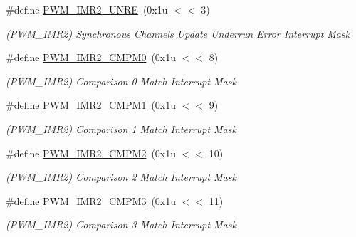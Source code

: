 \begin{DoxyCompactItemize}
\mbox{\label{group__SAME70__PWM_ga85e7cc43a764e203d90db792459a49c7}} 
\#define \mbox{\hyperlink{group__SAME70__PWM_ga85e7cc43a764e203d90db792459a49c7}{P\+W\+M\+\_\+\+I\+M\+R2\+\_\+\+U\+N\+RE}}~(0x1u $<$$<$ 3)
\begin{DoxyCompactList}\small\item\em (P\+W\+M\+\_\+\+I\+M\+R2) Synchronous Channels Update Underrun Error Interrupt Mask \end{DoxyCompactList}\item 
\mbox{\label{group__SAME70__PWM_ga37414bfbc6978c6fe9b00fa217792ca5}} 
\#define \mbox{\hyperlink{group__SAME70__PWM_ga37414bfbc6978c6fe9b00fa217792ca5}{P\+W\+M\+\_\+\+I\+M\+R2\+\_\+\+C\+M\+P\+M0}}~(0x1u $<$$<$ 8)
\begin{DoxyCompactList}\small\item\em (P\+W\+M\+\_\+\+I\+M\+R2) Comparison 0 Match Interrupt Mask \end{DoxyCompactList}\item 
\mbox{\label{group__SAME70__PWM_ga3ea81ef42b970526d8bbd56cb4b5d423}} 
\#define \mbox{\hyperlink{group__SAME70__PWM_ga3ea81ef42b970526d8bbd56cb4b5d423}{P\+W\+M\+\_\+\+I\+M\+R2\+\_\+\+C\+M\+P\+M1}}~(0x1u $<$$<$ 9)
\begin{DoxyCompactList}\small\item\em (P\+W\+M\+\_\+\+I\+M\+R2) Comparison 1 Match Interrupt Mask \end{DoxyCompactList}\item 
\mbox{\label{group__SAME70__PWM_ga9c940d51b51456920df0a6a30166023d}} 
\#define \mbox{\hyperlink{group__SAME70__PWM_ga9c940d51b51456920df0a6a30166023d}{P\+W\+M\+\_\+\+I\+M\+R2\+\_\+\+C\+M\+P\+M2}}~(0x1u $<$$<$ 10)
\begin{DoxyCompactList}\small\item\em (P\+W\+M\+\_\+\+I\+M\+R2) Comparison 2 Match Interrupt Mask \end{DoxyCompactList}\item 
\mbox{\label{group__SAME70__PWM_ga2106152052701756a91b5189fb60dcea}} 
\#define \mbox{\hyperlink{group__SAME70__PWM_ga2106152052701756a91b5189fb60dcea}{P\+W\+M\+\_\+\+I\+M\+R2\+\_\+\+C\+M\+P\+M3}}~(0x1u $<$$<$ 11)
\begin{DoxyCompactList}\small\item\em (P\+W\+M\+\_\+\+I\+M\+R2) Comparison 3 Match Interrupt Mask \end{DoxyCompactList}\item 
$$
\end{DoxyCompactItemize}
